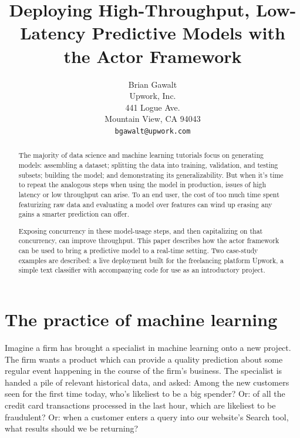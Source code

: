 \documentclass{article}
\begin{document}
\title{Deploying High-Throughput, Low-Latency Predictive Models with the Actor Framework}
\author{Brian Gawalt \\
Upwork, Inc. \\
441 Logue Ave. \\
Mountain View, CA   94043 \\
\texttt{bgawalt@upwork.com}
}

\maketitle

\begin{abstract}
 The majority of data science and machine learning tutorials focus on generating
models: assembling a dataset; splitting the data into training, validation, and
testing subsets; building the model; and demonstrating its generalizability. But
when it's time to repeat the analogous steps when using the model in production,
issues of high latency or low throughput can arise. To an end user, the cost of
too much time spent featurizing raw data and evaluating a model over features
can wind up erasing any gains a smarter prediction can offer.

 Exposing concurrency in these model-usage steps, and then capitalizing on that
concurrency, can improve throughput. This paper describes how the actor
framework can be used to bring a predictive model to a real-time setting. Two
case-study examples are described: a live deployment built for the freelancing 
platform Upwork, a simple text classifier with accompanying code for use as an
introductory project.
\end{abstract}

\section{The practice of machine learning}

 Imagine a firm has brought a specialist in machine learning onto a new project.
The firm wants a product which can provide a quality prediction about some
regular event happening in the course of the firm's business. The specialist is
handed a pile of relevant historical data, and asked: Among the new customers
seen for the first time today, who's likeliest to be a big spender? Or: of all
the credit card transactions processed in the last hour, which are likeliest to
be fraudulent? Or: when a customer enters a query into our website's Search
tool, what results should we be returning?
\end{document}
